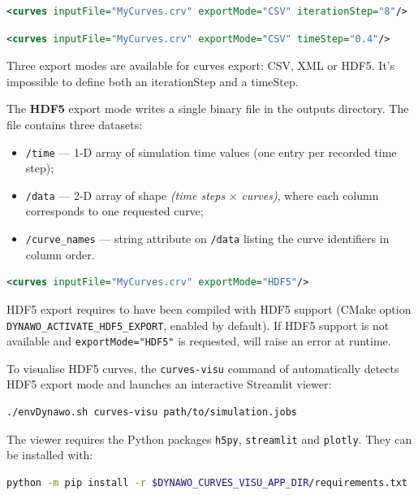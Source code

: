 \documentclass[a4paper, 12pt]{report}
\begin{document}
\begin{itemize}
\begin{lstlisting}[language=XML, morekeywords={curves},numbers=none]
<curves inputFile="MyCurves.crv" exportMode="CSV" iterationStep="8"/>
\end{lstlisting}

\begin{lstlisting}[language=XML, morekeywords={curves},numbers=none]
<curves inputFile="MyCurves.crv" exportMode="CSV" timeStep="0.4"/>
\end{lstlisting}

Three export modes are available for curves export: CSV, XML or HDF5.
It's impossible to define both an iterationStep and a timeStep.

The \textbf{HDF5} export mode writes a single binary file  in the outputs directory.
The file contains three datasets:
\begin{itemize}
  \item \texttt{/time} — 1-D array of simulation time values (one entry per recorded time step);
  \item \texttt{/data} — 2-D array of shape \textit{(time steps} $\times$ \textit{curves)}, where each column corresponds to one requested curve;
  \item \texttt{/curve\_names} — string attribute on \texttt{/data} listing the curve identifiers in column order.
\end{itemize}

\begin{lstlisting}[language=XML, morekeywords={curves},numbers=none]
<curves inputFile="MyCurves.crv" exportMode="HDF5"/>
\end{lstlisting}

HDF5 export requires \Dynawo to have been compiled with HDF5 support (CMake option \texttt{DYNAWO\_ACTIVATE\_HDF5\_EXPORT}, enabled by default).
If HDF5 support is not available and \texttt{exportMode="HDF5"} is requested, \Dynawo will raise an error at runtime.

To visualise HDF5 curves, the \texttt{curves-visu} command of  automatically detects HDF5 export mode and launches an interactive Streamlit viewer:
\begin{lstlisting}[language=bash,numbers=none]
./envDynawo.sh curves-visu path/to/simulation.jobs
\end{lstlisting}
The viewer requires the Python packages \texttt{h5py}, \texttt{streamlit} and \texttt{plotly}.
They can be installed with:
\begin{lstlisting}[language=bash,numbers=none]
python -m pip install -r $DYNAWO_CURVES_VISU_APP_DIR/requirements.txt
\end{lstlisting}


\end{itemize}
\end{document}
